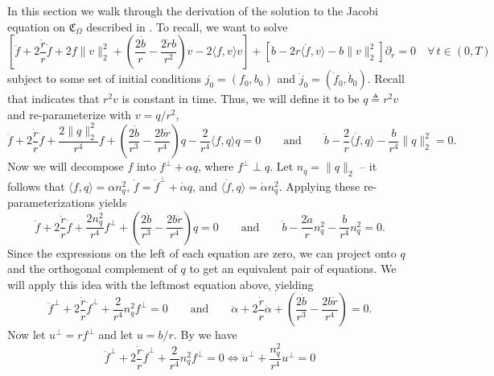 \documentclass[11pt]{article}
\begin{document}
In this section we walk through the derivation of the solution to the Jacobi equation on $\mathfrak{C}_\Omega$ described in . To recall, we want to solve
\[\left[\ddot f + 2\frac{\dot r}{r}\dot f + 2f\|v\|_2^2  + \left(\frac{2\dot b}{r} - \frac{2 \dot rb}{r^2}\right)v - 2\langle f,v\rangle v\right] + \left[\ddot b - 2r\langle \dot f, v\rangle - b\|v\|_2^2\right]\partial_r = 0 \quad \forall \,t \in (0, T)\]
subject to some set of initial conditions $j_0 = (f_0, b_0)$ and $\dot j_0 = (\dot f_0, \dot b_0)$. Recall that  indicates that $r^2v$ is constant in time. Thus, we will define it to be $q \triangleq r^2v$ and re-parameterize with $v = q/r^2$, 
\begin{equation*}
    \ddot f +  2\frac{\dot r}{r}\dot f +\frac{2\|q\|_2^2}{r^4}f + \left(\frac{2\dot b}{r^3} - \frac{ 2b\dot r}{r^4}\right)q - \frac{2}{r^4}\langle f, q\rangle q = 0 \qquad \text{and} \qquad \ddot b - \frac{2}{r}\langle \dot f, q\rangle - \frac{b}{r^4} \|q\|_2^2 = 0.
\end{equation*}
Now we will decompose $f$ into $f^{\perp} + \alpha q$, where $f^{\perp} \perp q$. Let $n_q = \|q\|_2$ -- it follows that $\langle f, q\rangle = \alpha n_q^2$, $\dot f = \dot f^{\perp} + \dot \alpha q$, and $\langle \dot f, q\rangle = \dot \alpha n_q^2$. Applying these re-parameterizations yields
\begin{equation*}
    \ddot f +  2\frac{\dot r}{r}\dot f + \frac{2n_q^2}{r^4}f^\perp  + \left(\frac{2\dot b}{r^3} - \frac{ 2b\dot r}{r^4}\right)q  = 0 \qquad \text{and} \qquad \ddot b - \frac{2\dot a}{r}n_q^2 - \frac{b}{r^4} n_q^2 = 0.
\end{equation*}
Since the expressions on the left of each equation are zero, we can project onto $q$ and the orthogonal complement of $q$ to get an equivalent pair of equations. We will apply this idea with the leftmost equation above, yielding
\begin{equation*}
    \ddot f^{\perp} +  2\frac{\dot r}{r}\dot f^{\perp} +\frac{2}{r^4}n_q^2f^{\perp} = 0 \qquad \text{and} \qquad \ddot \alpha +  2\frac{\dot r}{r}\dot \alpha + \left(\frac{2\dot b}{r^3} - \frac{ 2b\dot r}{r^4}\right)  = 0.
\end{equation*}
Now let $u^\perp = rf^\perp$ and let $u = b/r$. By  we have 
\begin{equation*} 
    \ddot f^{\perp} +  2\frac{\dot r}{r}\dot f^{\perp} +\frac{2}{r^4}n_q^2f^{\perp} = 0 \iff \ddot u^{\perp} + \frac{n_q^2}{r^4}u^\perp = 0
\end{equation*}
\end{document}
